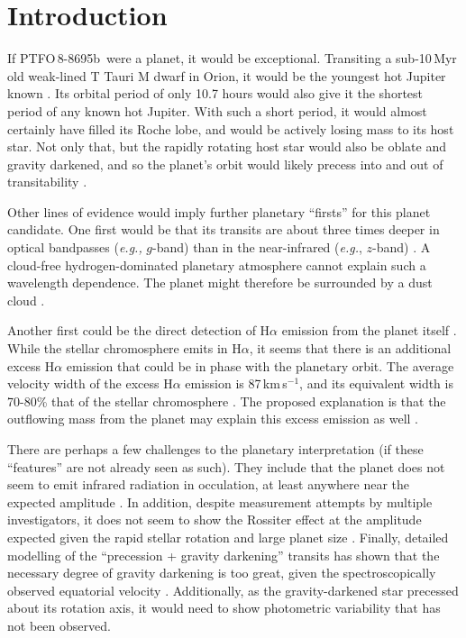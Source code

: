 \documentclass[12pt,twocolumn,tighten]{aastex62}
\newcommand{\ptfob}{PTFO$\,$8-8695b}
\begin{document}
\section{Introduction}
If \ptfob\ were a planet, it would be exceptional.  Transiting a sub-10$\,$Myr
old weak-lined T Tauri M dwarf in Orion, it would be the youngest hot Jupiter
known \citep{van_eyken_ptf_2012}.  Its orbital period of only 10.7 hours would
also give it the shortest period of any known hot Jupiter.  With such a short
period, it would almost certainly have filled its Roche lobe, and would be
actively losing mass to its host star.  Not only that, but the rapidly rotating
host star would also be oblate and gravity darkened, and so the planet's orbit
would likely precess into and out of transitability
\citep{barnes_measurement_2013,ciardi_followup_2015,kamiaka_revisiting_2015}. 

Other lines of evidence would imply further planetary ``firsts'' for
this planet candidate.  One first would be that its transits are about three
times deeper in optical bandpasses ({\it e.g.,} $g$-band) than in the near-infrared
({\it e.g.}, $z$-band) \citep{onitsuka_multicolor_2017,tanimoto_evidence_2020}.
A cloud-free hydrogen-dominated planetary atmosphere cannot explain such a
wavelength dependence.  The planet might therefore be surrounded by a
dust cloud \citep{tanimoto_evidence_2020}.  

Another first could be the direct detection of H$\alpha$ emission from the
planet itself \citep{johnskrull_h_2016}.  While the stellar chromosphere emits
in H$\alpha$, it seems that there is an additional excess H$\alpha$ emission
that could be in phase with the planetary orbit.  The average velocity width of
the excess H$\alpha$ emission is 87$\,$km$\,$s$^{-1}$, and its equivalent width
is 70-80\% that of the stellar chromosphere \citep{johnskrull_h_2016}.  The
proposed explanation is that the outflowing mass from the planet may explain
this excess emission as well \citep{johnskrull_h_2016}.

There are perhaps a few challenges to the planetary interpretation (if
these ``features'' are not already seen as such).  They include that
the planet does not seem to emit infrared radiation in occulation, at
least anywhere near the expected amplitude \citep{yu_tests_2015}.  In
addition, despite measurement attempts by multiple investigators, it
does not seem to show the Rossiter effect at the amplitude expected
given the rapid stellar rotation and large planet size
\citep{yu_tests_2015,ciardi_followup_2015}.  Finally, detailed
modelling of the ``precession + gravity darkening'' transits has shown
that the necessary degree of gravity darkening is too great, given the
spectroscopically observed equatorial velocity
\citep{howarth_reappraisal_2016}.  Additionally, as the gravity-darkened
star precessed about its rotation axis, it would need to show
photometric variability that has not been observed.
\end{document}
